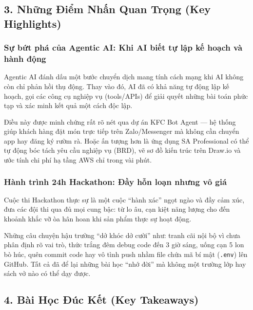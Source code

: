\hypertarget{nhux1eefng-ux111iux1ec3m-nhux1ea5n-quan-trux1ecdng-key-highlights}{%
\subsection{3. Những Điểm Nhấn Quan Trọng (Key
Highlights)}}

\hypertarget{sux1ef1-bux1ee9t-phuxe1-cux1ee7a-agentic-ai-khi-ai-biux1ebft-tux1ef1-lux1eadp-kux1ebf-houx1ea1ch-vuxe0-huxe0nh-ux111ux1ed9ng}{%
\subsubsection{Sự bứt phá của Agentic AI: Khi AI biết tự lập kế hoạch và
hành
động}}

Agentic AI đánh dấu một bước chuyển dịch mang tính cách mạng khi AI
không còn chỉ phản hồi thụ động. Thay vào đó, AI đã có khả năng tự động
lập kế hoạch, gọi các công cụ nghiệp vụ (tools/APIs) để giải quyết những
bài toán phức tạp và xác minh kết quả một cách độc lập.

Điều này được minh chứng rất rõ nét qua dự án KFC Bot Agent --- hệ thống
giúp khách hàng đặt món trực tiếp trên Zalo/Messenger mà không cần
chuyển app hay đăng ký rườm rà. Hoặc ấn tượng hơn là ứng dụng SA
Professional có thể tự động bóc tách yêu cầu nghiệp vụ (BRD), vẽ sơ đồ
kiến trúc trên Draw.io và ước tính chi phí hạ tầng AWS chỉ trong vài
phút.

\hypertarget{huxe0nh-truxecnh-24h-hackathon-ux111ux1ea7y-hux1ed7n-loux1ea1n-nhux1b0ng-vuxf4-giuxe1}{%
\subsubsection{Hành trình 24h Hackathon: Đầy hỗn loạn nhưng vô
giá}}

Cuộc thi Hackathon thực sự là một cuộc ``hành xác'' ngọt ngào và đầy cảm
xúc, đưa các đội thi qua đủ mọi cung bậc: từ lo âu, cạn kiệt năng lượng
cho đến khoảnh khắc vỡ òa hân hoan khi sản phẩm thực sự hoạt động.

Những câu chuyện hậu trường ``dở khóc dở cười'' như: tranh cãi nội bộ vì
chưa phân định rõ vai trò, thức trắng đêm debug code đến 3 giờ sáng,
uống cạn 5 lon bò húc, quên commit code hay vô tình push nhầm file chứa
mã bí mật (\texttt{.env}) lên GitHub. Tất cả đã để lại những bài học
``nhớ đời'' mà không một trường lớp hay sách vở nào có thể dạy được.

\hypertarget{buxe0i-hux1ecdc-ux111uxfac-kux1ebft-key-takeaways}{%
\subsection{4. Bài Học Đúc Kết (Key
Takeaways)}}

